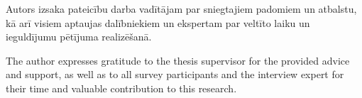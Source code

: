\frontmatterpage
{}
Autors izsaka pateicību darba vadītājam par sniegtajiem padomiem un atbalstu,
kā arī visiem aptaujas dalībniekiem un ekspertam par veltīto laiku un ieguldījumu
pētījuma realizēšanā.

The author expresses gratitude to the thesis supervisor for the provided advice
and support, as well as to all survey participants and the interview expert for
their time and valuable contribution to this research.
